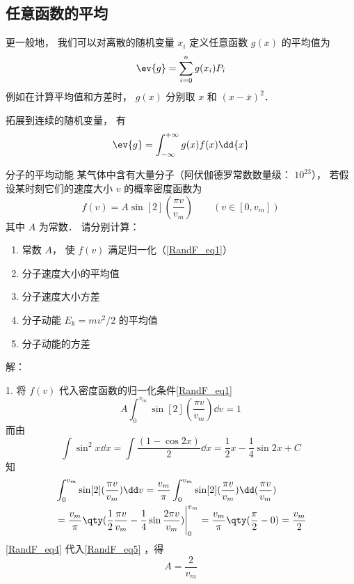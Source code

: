 \subsection{任意函数的平均}
更一般地， 我们可以对离散的随机变量 $x_i$ 定义任意函数 $g(x)$ 的平均值为
\begin{equation}\label{RandF_eq3}
\ev{g} = \sum_{i=0}^n g(x_i) P_i
\end{equation}
例如在计算平均值和方差时， $g(x)$ 分别取 $x$ 和 $(x - \bar x)^2$．

拓展到连续的随机变量， 有
\begin{equation}\label{RandF_eq2}
\ev{g} = \int_{-\infty}^{+\infty} g(x) f(x) \dd{x}
\end{equation}

\begin{example}{分子的平均动能}
某气体中含有大量分子（阿伏伽德罗常数数量级： $10^{23}$）， 若假设某时刻它们的速度大小 $v$ 的概率密度函数为
\begin{equation}
f(v) = A \sin[2](\frac{\pi v}{v_{m}}) \qquad (v \in [0, v_{m}])
\end{equation}
其中 $A$ 为常数． 请分别计算：
\begin{enumerate}
\item 常数 $A$， 使 $f(v)$ 满足归一化（\autoref{RandF_eq1}）
\item 分子速度大小的平均值
\item 分子速度大小方差
\item 分子动能 $E_k = mv^2/2$ 的平均值
\item 分子动能的方差
\end{enumerate}

解：

1. 将 $f(v)$ 代入密度函数的归一化条件\autoref{RandF_eq1} 
\begin{equation}\label{RandF_eq5}
A\int_{0}^{v_{m}} \sin[2](\frac{\pi v}{v_{m}})\dd v= 1
\end{equation}
而由
\begin{equation}
\int \sin^2 x\dd x = \int\frac{(1-\cos 2x)}{2}\dd x = \frac{1}{2}x-\frac{1}{4}\sin 2x+C
\end{equation}
知
\begin{equation}\label{RandF_eq4}
\begin{aligned}
&\int_{0}^{v_{m}} \sin[2](\frac{\pi v}{v_{m}})\dd v=\frac{v_{m}}{\pi}\int_{0}^{v_{m}} \sin[2](\frac{\pi v}{v_{m}})\dd (\frac{\pi v}{v_{m}})\\
&=\frac{v_{m}}{\pi}\qty (\frac{1}{2}\frac{\pi v}{v_{m}}-\frac{1}{4}\sin \frac{2\pi v}{v_{m}})\Bigg|_{0}^{v_{m}}=\frac{v_{m}}{\pi}\qty(\frac{\pi}{2}-0)=\frac{v_{m}}{2}
\end{aligned}
\end{equation}
\autoref{RandF_eq4} 代入\autoref{RandF_eq5} ，得 
\begin{equation}
A=\frac{2}{v_{m}}
\end{equation}


\end{example}

